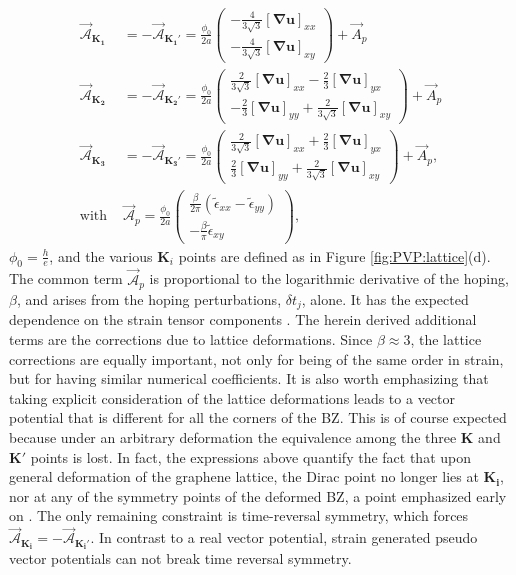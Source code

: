 \begin{align}
  \vec{\mathcal{A}}_{\bm{K_1}}&=-\vec{\mathcal{A}}_{\bm{K_1'}}=
    \frac{\phi_0}{2a} \left( \begin{array}{c} 
      -\frac{4}{3\sqrt{3}} [\bm{\nabla u}]_{xx} \\ 
      -\frac{4}{3\sqrt{3}} [\bm{\nabla u}]_{xy}
    \end{array} \right) +\vec{A}_p \nonumber \\ 
  \vec{\mathcal{A}}_{\bm{K_2}}&=-\vec{\mathcal{A}}_{\bm{K_2'}}=
    \frac{\phi_0}{2a} \left( \begin{array}{c} 
      \frac{2}{3\sqrt{3}}[\bm{\nabla u}]_{xx}-\frac{2}{3} [\bm{\nabla u}]_{yx} \\
      -\frac{2}{3} [\bm{\nabla u}]_{yy}+\frac{2}{3 \sqrt{3}} [\bm{\nabla u}]_{xy}
    \end{array} \right)+\vec{A}_p  \nonumber \\
  \vec{\mathcal{A}}_{\bm{K_3}}&=-\vec{\mathcal{A}}_{\bm{K_3'}}=
    \frac{\phi_0}{2a} \left( \begin{array}{c}
      \frac{2}{3\sqrt{3}}[\bm{\nabla u}]_{xx}+\frac{2}{3} [\bm{\nabla u}]_{yx} \\
      \frac{2}{3} [\bm{\nabla u}]_{yy}+\frac{2}{3 \sqrt{3}} [\bm{\nabla u}]_{xy}
    \end{array} \right)+\vec{A}_p  , \nonumber \\
  \textrm{with }
  &\vec{\mathcal{A}}_p= 
    \frac{\phi_0}{2a} \left( \begin{array}{c} 
      \frac{\beta }{2 \pi} (\tilde{\epsilon}_{xx}-\tilde{\epsilon}_{yy}) \\
      -\frac{\beta}{\pi} \tilde{\epsilon}_{xy}
    \end{array} \right),
  \label{eq:PVP:PVP}
\end{align}
$\phi_0=\frac{h}{e}$, and the various $\bm{K}_i$ points are defined as in Figure \ref{fig:PVP:lattice}(d).
The common term $\vec{\mathcal{A}}_p$ is proportional to the logarithmic derivative of the hoping, $\beta$, and arises from the hoping perturbations, $\delta t_j$, alone.
It has the expected dependence on the strain tensor components \cite{CastroNeto2009,Vozmediano2010}. 
The herein derived additional terms are the corrections due to lattice deformations.
Since $\beta \approx 3$, the lattice corrections are equally important, not only for being of the same order in strain, but for having similar numerical coefficients.
It is also worth emphasizing that taking explicit consideration of the lattice deformations leads to a vector potential that is different for all the corners of the BZ.
This is of course expected because under an arbitrary deformation the equivalence among the three $\bm{K}$ and $\bm{K'}$ points is lost.
In fact, the expressions above quantify the fact that upon general deformation of the graphene lattice, the Dirac point no longer lies at $\bm{K_i}$, nor at any of the symmetry points of the deformed BZ, a point emphasized early on \cite{Pereira2009}.
The only remaining constraint is time-reversal symmetry, which forces $\vec{\mathcal{A}}_{\bm{K_i}} = - \vec{\mathcal{A}}_{\bm{K_i'}}$.
In contrast to a real vector potential, strain generated pseudo vector potentials can not break time reversal symmetry.

